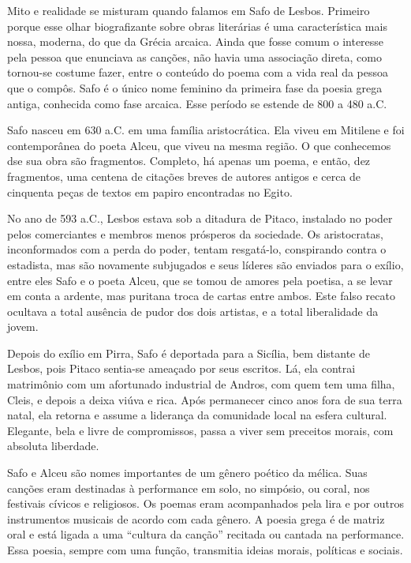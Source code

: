 \documentclass[12pt]{extarticle}
\begin{document}
Mito e realidade se misturam quando falamos em Safo de Lesbos. Primeiro porque
esse olhar biografizante sobre obras literárias é uma característica mais nossa,
moderna, do que da Grécia arcaica. Ainda que fosse comum o interesse pela pessoa
que enunciava as canções, não havia uma associação direta, como tornou-se costume
fazer, entre o conteúdo do poema com a vida real da pessoa que o compôs.
Safo é o único nome feminino da primeira fase da poesia grega antiga, conhecida 
como fase arcaica. Esse período se estende de 800 a 480 a.C.

Safo nasceu em 630 a.C. em uma família aristocrática. Ela viveu em Mitilene e foi 
contemporânea do poeta Alceu, que viveu na mesma região. O que conhecemos dse sua
obra são fragmentos. Completo, há apenas um poema, e então, dez fragmentos, uma centena 
de citações breves de autores antigos e cerca de cinquenta peças de textos em papiro
encontradas no Egito.

No ano de 593 a.C., Lesbos estava sob a ditadura de Pitaco, instalado no poder pelos 
comerciantes e membros menos prósperos da sociedade. Os aristocratas, inconformados 
com a perda do poder, tentam resgatá-lo, conspirando contra o estadista, mas são 
novamente subjugados e seus líderes são enviados para o exílio, entre eles Safo e 
o poeta Alceu, que se tomou de amores pela poetisa, a se levar em conta a ardente, 
mas puritana troca de cartas entre ambos. Este falso recato ocultava a total ausência 
de pudor dos dois artistas, e a total liberalidade da jovem.

Depois do exílio em Pirra, Safo é deportada para a Sicília, bem distante de Lesbos, 
pois Pitaco sentia-se ameaçado por seus escritos. Lá, ela contrai matrimônio com um 
afortunado industrial de Andros, com quem tem uma filha, Cleis, e depois a deixa 
viúva e rica. Após permanecer cinco anos fora de sua terra natal, ela retorna e 
assume a liderança da comunidade local na esfera cultural. Elegante, bela e livre 
de compromissos, passa a viver sem preceitos morais, com absoluta liberdade.

Safo e Alceu são nomes importantes de um gênero poético da mélica. Suas canções 
eram destinadas à performance em solo, no simpósio, ou coral, nos festivais cívicos 
e religiosos. Os poemas eram acompanhados pela lira e por outros instrumentos musicais 
de acordo com cada gênero. A poesia grega é de matriz oral e está ligada a uma 
“cultura da canção” recitada ou cantada na performance. Essa poesia, sempre com uma 
função, transmitia ideias morais, políticas e sociais.
\end{document}
